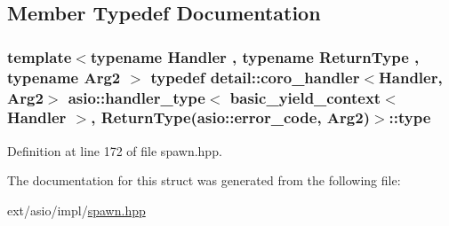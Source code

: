 \subsection{Member Typedef Documentation}
\hypertarget{structasio_1_1handler__type_3_01basic__yield__context_3_01_handler_01_4_00_01_01_01_01_01_01_01_d15b502de1534464d7abfd193f1b4967_ac79206d3bc40e561474c164aa76250ec}{}
\subsubsection[{type}]{\setlength{\rightskip}{0pt plus 5cm}template$<$typename Handler , typename Return\+Type , typename Arg2 $>$ typedef {\bf detail\+::coro\+\_\+handler}$<$Handler, Arg2$>$ {\bf asio\+::handler\+\_\+type}$<$ {\bf basic\+\_\+yield\+\_\+context}$<$ Handler $>$,           Return\+Type({\bf asio\+::error\+\_\+code}, Arg2)$>$\+::{\bf type}}\label{structasio_1_1handler__type_3_01basic__yield__context_3_01_handler_01_4_00_01_01_01_01_01_01_01_d15b502de1534464d7abfd193f1b4967_ac79206d3bc40e561474c164aa76250ec}


Definition at line 172 of file spawn.\+hpp.



The documentation for this struct was generated from the following file\+:\begin{DoxyCompactItemize}
\item 
ext/asio/impl/\hyperlink{impl_2spawn_8hpp}{spawn.\+hpp}\end{DoxyCompactItemize}
